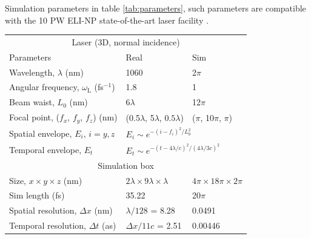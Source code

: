 Simulation parameters in table \ref{tab:parameters}, such parameters are compatible with the 10 PW ELI-NP state-of-the-art laser facility \cite{tanakaCurrentStatusHighlights2020}.
\begin{table}[]
	\begin{center}
	\begin{tabular}{lll}
		\hline \hline
		\multicolumn{3}{c}{Laser (3D, normal incidence)}   \\
		Parameters                                        & Real                                 & Sim                         \\ \hline
		Wavelength, $\lambda$ (nm)                        & 1060                                 & 2$\pi$                      \\
		Angular frequency, $\omega_\mathrm{L}$ (fs$^{-1}$)         & 1.8                                  & 1                           \\
		Beam waist, $L_0$ (nm)                            & 6$\lambda$                           & 12$\pi$                     \\
		Focal point, ($f_x$, $f_y$, $f_z$) (nm)                  & (0.5$\lambda$, 5$\lambda$, $0.5\lambda$)             & ($\pi$, 10$\pi$, $\pi$)           \vspace{0.25cm}\\ 
		Spatial envelope, $E_i$, $i = y,z$                           & \multicolumn{2}{l}{$E_i \sim e^{-(i-f_i)^2/L_0^2}$}                \\
		Temporal envelope, $E_t$                          & \multicolumn{2}{l}{$E_t \sim e^{-(t-4\lambda/c)^2/(4\lambda/3c)^2}$} \vspace{0.15cm}\\ \hline \hline
		\multicolumn{3}{c}{Simulation box}   \\ \hline
		Size, $x \times y\times z$ (nm)                           & $2\lambda \times 9\lambda \times \lambda$          & $4\pi \times 18\pi \times 2\pi$         \\
		Sim length (fs)                                   & 35.22                                & 20$\pi$                     \\
		Spatial resolution, $\Delta x$ (nm)               & $\lambda/128$ = 8.28                 & 0.0491                      \\
		Temporal resolution, $\Delta t$ (as)              & $\Delta x/11c$ = 2.51               & 0.00446                   \vspace{0.15cm}  \\ \hline \hline

\end{tabular}
\end{center}
\end{table}
